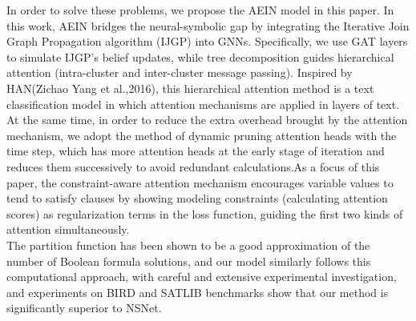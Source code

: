 In order to solve these problems, we propose the AEIN model in this paper. In this work, AEIN bridges the neural-symbolic gap by 
integrating the Iterative Join Graph Propagation  algorithm (IJGP)\cite{A15} into GNNs.   Specifically, we use GAT layers to simulate 
IJGP's belief updates, while tree decomposition guides hierarchical attention (intra-cluster and inter-cluster message passing). 
Inspired by HAN(Zichao Yang et al.,2016)\cite{B5}, this hierarchical attention method is a text classification model in which attention 
mechanisms are applied in layers of text. At the same time, in order to reduce the extra overhead brought by the attention mechanism, 
we adopt the method of dynamic pruning attention heads with the time step\cite{B6}\cite{A16}, which has more attention heads at the early 
stage of iteration and reduces them successively to avoid redundant calculations.As a focus of this paper, the constraint-aware attention 
mechanism encourages variable values to tend to satisfy clauses by showing modeling constraints (calculating attention scores) as 
regularization terms in the loss function, guiding the first two kinds of attention simultaneously. \\

The partition function has been shown to be a good approximation of the number of Boolean formula solutions\cite{A17}\cite{A18}, and 
our model similarly follows this computational approach, with careful and extensive experimental investigation, and experiments on BIRD 
and SATLIB benchmarks show that our method is significantly superior to NSNet. 
